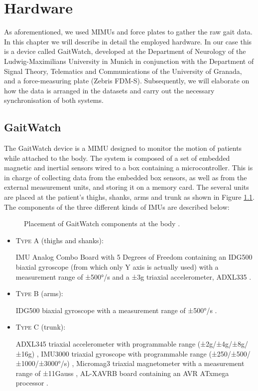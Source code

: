 \chapter{Hardware}
\label{ch:Hardware}

As aforementioned, we used MIMUs and force plates to gather the raw gait data. In this chapter we will describe in detail the employed hardware. In our case this is a device called GaitWatch, developed at the Department of Neurology of the Ludwig-Maximilians University in Munich in conjunction with the Department of Signal Theory, Telematics and Communications of the University of Granada, and a force-measuring plate (Zebris FDM-S). Subsequently, we will elaborate on how the data is arranged in the datasets and carry out the necessary synchronisation of both systems.

\section{GaitWatch}

The GaitWatch device is a MIMU designed to monitor the motion of patients while attached to the body. The system is composed of a set of embedded magnetic and inertial sensors wired to a box containing a microcontroller. This is in charge of collecting data from the embedded box sensors, as well as from the external measurement units, and storing it on a memory card. The several units are placed at the patient's thighs, shanks, arms and trunk as shown in Figure \ref{fig:GaitWatch_placement}. The components of the three different kinds of IMUs are described below:

\begin{figure}
	\centering
	\caption{Placement of GaitWatch components at the body \cite{olivares_vicente_gaitwatch_2013}.}
	\label{fig:GaitWatch_placement}
\end{figure}

\begin{itemize}

\item \textsc{Type A} (thighs and shanks): 

IMU Analog Combo Board with 5 Degrees of Freedom \cite{IMU5} containing an IDG500 biaxial gyroscope (from which only Y axis is actually used) with a measurement range of ±500°/s \cite{IDG500} and a ±3g triaxial accelerometer, ADXL335 \cite{ADXL335}.

\item \textsc{Type B} (arms):

IDG500 biaxial gyroscope with a measurement range of ±500°/s \cite{IDG500}.

\item \textsc{Type C} (trunk):

ADXL345 triaxial accelerometer with programmable range (±2g/±4g/±8g/±16g) \cite{ADXL345},
IMU3000 triaxial gyroscope with programmable range (±250/±500/±1000/±3000°/s) \cite{IMU3000}, 
Micromag3 triaxial magnetometer with a measurement range of ±11Gauss \cite{MicroMag3}, AL-XAVRB board containing an AVR ATxmega processor \cite{AVRATxmega}.

\end{itemize}


